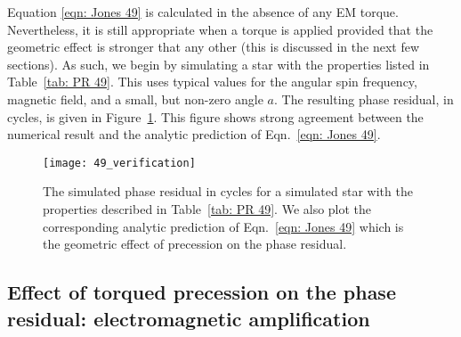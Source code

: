\documentclass[../full_thesis/full_thesis.tex]{subfiles}
\newcommand{\thisdir}{../inertial_frame}
\begin{document}
Equation \eqref{eqn: Jones 49} is calculated in the absence of any EM torque.
Nevertheless, it is still appropriate when a torque is applied provided
that the geometric effect is stronger that any other (this is discussed in
the next few sections). As such, we begin by simulating a star with the
properties listed in Table~\ref{tab: PR 49}. This uses typical values
for the angular spin frequency, magnetic field, and a small, but non-zero
angle $a$.
The resulting phase residual, in cycles, is given in Figure~\ref{fig: PR 49}.
This figure shows strong agreement between the numerical result and the
analytic prediction of Eqn.~\eqref{eqn: Jones 49}.

\begin{table}[htb]
\centering

\caption{Simulation parameters used for the phase residual plotted in
Figure~\ref{fig: PR 49}. Note that $\Aem$ is the electromagnetic amplification
factor defined later in Eqn.~\eqref{eqn: EM amplification}.}
\label{tab: PR 49}
\end{table}

\begin{figure}[htb]
\centering
\texttt{[image: 49\_verification]}
\caption{The simulated phase residual in cycles for a simulated star with the
properties described in Table~\ref{tab: PR 49}. We also plot the corresponding
analytic prediction of Eqn.~\eqref{eqn: Jones 49} which is the geometric effect
of precession on the phase residual.}
\label{fig: PR 49}
\end{figure}

\subsection{Effect of torqued precession on the phase residual: electromagnetic amplification}
\label{sec: phase residual torqued}
\end{document}
